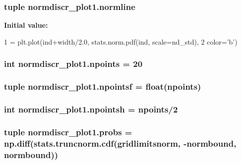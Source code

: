 \subsubsection[{normline}]{\setlength{\rightskip}{0pt plus 5cm}tuple normdiscr\+\_\+plot1.\+normline}\label{namespacenormdiscr__plot1_a05db0418bf9e3cb9363768346fd33093}
{\bfseries Initial value\+:}
\begin{DoxyCode}
1 = plt.plot(ind+width/2.0, stats.norm.pdf(ind, scale=nd\_std),
2                     color=\textcolor{stringliteral}{'b'})
\end{DoxyCode}
\hypertarget{namespacenormdiscr__plot1_a485936f90b1ce55005303b1b7a1087da}{}
\subsubsection[{npoints}]{\setlength{\rightskip}{0pt plus 5cm}int normdiscr\+\_\+plot1.\+npoints = 20}\label{namespacenormdiscr__plot1_a485936f90b1ce55005303b1b7a1087da}
\hypertarget{namespacenormdiscr__plot1_a5b663a435991ce67832c93f23719c25b}{}
\subsubsection[{npointsf}]{\setlength{\rightskip}{0pt plus 5cm}tuple normdiscr\+\_\+plot1.\+npointsf = float({\bf npoints})}\label{namespacenormdiscr__plot1_a5b663a435991ce67832c93f23719c25b}
\hypertarget{namespacenormdiscr__plot1_ad5aacb86498a3f1b06f4b093db60c159}{}
\subsubsection[{npointsh}]{\setlength{\rightskip}{0pt plus 5cm}int normdiscr\+\_\+plot1.\+npointsh = {\bf npoints}/2}\label{namespacenormdiscr__plot1_ad5aacb86498a3f1b06f4b093db60c159}
\hypertarget{namespacenormdiscr__plot1_a2ba9cf9aea62e481cf4d32d07cddbd39}{}
\subsubsection[{probs}]{\setlength{\rightskip}{0pt plus 5cm}tuple normdiscr\+\_\+plot1.\+probs = {\bf np.\+diff}(stats.\+truncnorm.\+cdf({\bf gridlimitsnorm}, -\/{\bf normbound}, {\bf normbound}))}\label{namespacenormdiscr__plot1_a2ba9cf9aea62e481cf4d32d07cddbd39}
\hypertarget{namespacenormdiscr__plot1_a2181998588c54cf2e52c63bfd440e939}{}
